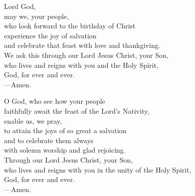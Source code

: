 \prayer


\begin{prayerverse}
Lord God,\\
may we, your people,\\
who look forward to the birthday of Christ\\
experience the joy of salvation\\
and celebrate that feast with love and thankgiving.\\
We ask this through our Lord Jesus Christ, your Son,\\
who lives and reigns with you and the Holy Spirit,\\
God, for ever and ever.\\
{\color{red}---\thinspace}Amen.
\end{prayerverse}


\begin{prayerverse}
O God, who see how your people\\
faithfully await the feast of the Lord’s Nativity,\\
enable us, we pray,\\
to attain the joys of so great a salvation\\
and to celebrate them always\\
with solemn worship and glad rejoicing.\\
Through our Lord Jesus Christ, your Son,\\
 who lives and reigns with you in the unity of the Holy Spirit,\\
God, for ever and ever.\\
{\color{red}---\thinspace}Amen.
\end{prayerverse}

